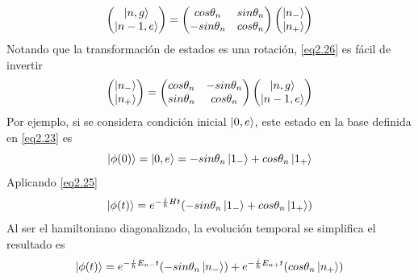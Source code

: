 \documentclass{book}
\begin{document}
\begin{equation}\label{eq2.26}\begin{pmatrix}\ket{n,g}\\ \ket{n-1,e}\end{pmatrix}=\begin{pmatrix}cos \theta_n&sin\theta_n\\-sin\theta_n&cos\theta_n\end{pmatrix}\begin{pmatrix}\ket{n_-}\\\ket{n_+}\end{pmatrix}\end{equation}
Notando que la transformación de estados es una rotación, \ref{eq2.26} es fácil de invertir
\begin{equation}\label{eq2.27}\begin{pmatrix}\ket{n_-}\\\ket{n_+}\end{pmatrix}=\begin{pmatrix}cos\theta_n&-sin\theta_n\\sin\theta_n&cos\theta_n\end{pmatrix}\begin{pmatrix}\ket{n,g}\\\ket{n-1,e}\end{pmatrix}\end{equation}
Por ejemplo, si se considera condición inicial $\ket{0,e}$, este estado en la base definida en \ref{eq2.23} es 
\begin{equation}\label{eq2.28}\ket{\phi(0)}=\ket{0,e}=-sin\theta_n\ket{1_-}+cos\theta_n\ket{1_+}\end{equation}
Aplicando \ref{eq2.25} 
\begin{equation}\label{eq2.29}\ket{\phi(t)}=e^{-\frac{i}{\hslash}Ht}(-sin\theta_n\ket{1_-}+cos\theta_n\ket{1_+})\end{equation}
Al ser el hamiltoniano diagonalizado, la evolución temporal se simplifica el resultado es
\begin{equation}\label{eq2.30}\ket{\phi(t)}=e^{-\frac{i}{\hslash}E_{n-}t}(-sin\theta_n\ket{n_-})+e^{-\frac{i}{\hslash}E_{n+}t}(cos\theta_n\ket{n_+})\end{equation}
\end{document}

